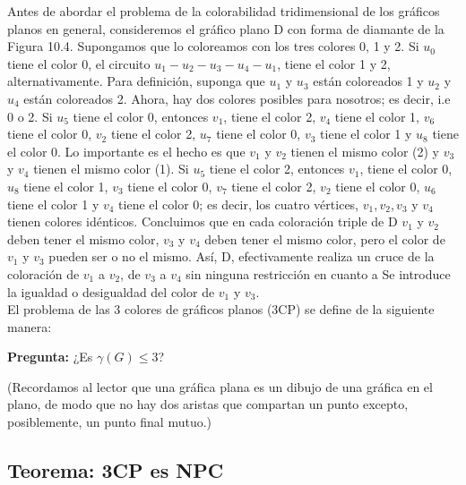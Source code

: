 Antes de abordar el problema de la colorabilidad tridimensional de los gráficos planos en general, consideremos el 
gráfico plano D con forma de diamante de la Figura 10.4. Supongamos que lo coloreamos con los tres colores 0, 1 y 2. 
Si $u_{0}$ tiene el color 0, el circuito $u_{1} - u_{2} - u_{3} - u_{4} - u_ {1}$, tiene el color 1 y 2, 
alternativamente. Para definición, suponga que $ u_ {1} $ y $ u_ {3} $ están coloreados 1 y $u_ {2}$ y $ u_ {4}$ 
están coloreados 2. Ahora, hay dos colores posibles para nosotros; es decir, i.e 0 o 2. Si $u_ {5}$ tiene el color 0,
entonces $v_{1}$, tiene el color 2, $v_{4}$ tiene el color 1, $v_{6}$ tiene el color 0, $v_{2}$ tiene el color 2,
$u_{7}$ tiene el color 0, $v_{3}$ tiene el color 1 y $u_{8}$ tiene el color 0. Lo importante es el hecho es que 
$v_{1}$ y $v_{2}$ tienen el mismo color (2) y $v_{3}$ y $v_{4}$ tienen el mismo color (1). Si $u_{5}$ tiene el color 2, 
entonces $v_{1}$, tiene el color 0, $u_{8}$ tiene el color 1, $v_{3}$ tiene el color 0, $v_{7}$ tiene el color 2, 
$v_{2}$ tiene el color 0, $u_{6}$ tiene el color 1 y $v_{4}$ tiene el color 0; es decir, los cuatro vértices, 
$v_{1}, v_{2}, v_{3}$ y $v_{4}$ tienen colores idénticos. Concluimos que en cada coloración triple de D $v_{1}$ y $v_{2}$
deben tener el mismo color, $v_{3}$ y $v_{4}$ deben tener el mismo color, pero el color de $v_{1}$ y $v_{3}$ pueden ser 
o no el mismo. Así, D, efectivamente realiza un cruce de la coloración de $v_{1}$ a $v_{2}$, de $v_{3}$ a $v_{4}$ sin ninguna restricción en cuanto a
Se introduce la igualdad o desigualdad del color de $v_{1}$ y $v_{3}$.\\ 


El problema de las 3 colores de gráficos planos (3CP) se define de la siguiente manera:

\textbf{Pregunta:} ¿Es $\gamma (G) \leq 3 $?

(Recordamos al lector que una gráfica plana es un dibujo de una gráfica en el plano, de modo que no hay dos aristas 
que compartan un punto excepto, posiblemente, un punto final mutuo.)

\subsection*{Teorema: 3CP es NPC} 

